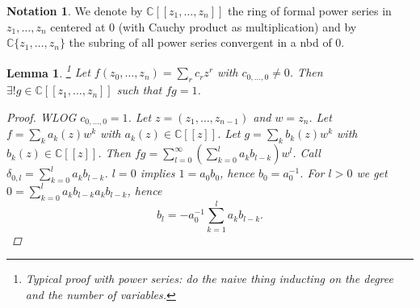 \documentclass[11pt,A4]{article}
\theoremstyle{plain}
\newtheorem{lm}[thm]{Lemma}
\theoremstyle{definition}
\newtheorem{nota}[thm]{Notation}
\theoremstyle{remark}
\newcommand{\1}{\mathbbm{1}}
\newcommand{\C}{\mathbb{C}}
\begin{document}
\begin{nota}
    We denote by $\C[[z_{1},\ldots,z_{n}]]$ the ring of formal power series in $z_{1},\ldots,z_{n}$ centered at $0$ (with Cauchy product as multiplication) and by $\C\{z_{1},\ldots,z_{n}\}$ the subring of all power series convergent in a nbd of $0$.
\end{nota}

\begin{lm}\footnote{Typical proof with power series: do the naive thing inducting on the degree and the number of variables.}
    Let $f(z_{0},\ldots,z_{n})=\sum_{r} c_{r}z^{r}$ with $c_{0,\ldots, 0}\neq 0$.
    Then $\exists !g\in \C[[z_{1},\ldots,z_{n}]]$ such that $fg=1$.
    \begin{proof}
	WLOG $c_{0,\ldots, 0}=1$.
	Let $z=(z_{1},\ldots,z_{n-1})$ and $w=z_{n}$.
	Let $f=\sum_{k}a_{k}(z)w^{k}$ with $a_{k}(z)\in \C[[z]]$.
	Let $g=\sum_{k} b_{k}(z)w^{k}$ with $b_{k}(z)\in \C[[z]]$.
	Then $fg=\sum_{l=0}^{\infty}(\sum_{k=0}^{l}a_{k}b_{l-k})w^{l}$.
	Call $\delta_{0,l}=\sum_{k=0}^{l}a_{k}b_{l-k}$.
	$l=0$ implies $1=a_{0}b_{0}$, hence $b_{0}=a_{0}^{-1}$.
	For $l>0$ we get $0=\sum_{k=0}^{l}a_{k}b_{l-k}a_{k}b_{l-k}$, hence
	\[b_{l}=-a_{0}^{-1}\sum_{k=1}^{l}a_{k}b_{l-k}.\]
    \end{proof}
\end{lm}
\end{document}
